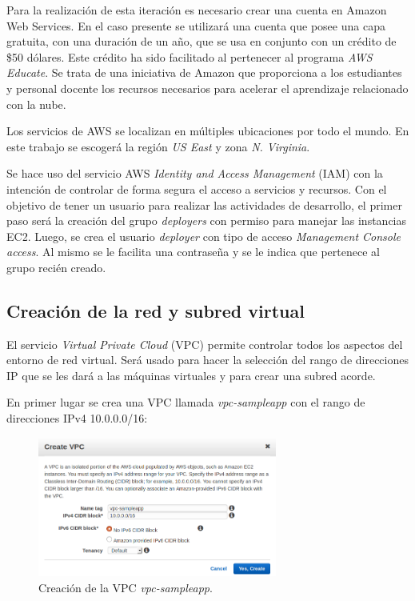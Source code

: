 Para la realización de esta iteración es necesario crear una cuenta en Amazon Web Services. En el caso presente se utilizará una cuenta que posee una capa gratuita, con una duración de un año, que se usa en conjunto con un crédito de \$50 dólares. Este crédito ha sido facilitado al pertenecer al programa \textit{AWS Educate}\cite{AWS Educate}. Se trata de una iniciativa de Amazon que proporciona a los estudiantes y personal docente los recursos necesarios para acelerar el aprendizaje relacionado con la nube.

Los servicios de AWS se localizan en múltiples ubicaciones por todo el mundo. En este trabajo se escogerá la región \textit{US East} y zona \textit{N. Virginia}.

Se hace uso del servicio AWS \textit{Identity and Access Management} (IAM) con la intención de controlar de forma segura el acceso a servicios y recursos. Con el objetivo de tener un usuario para realizar las actividades de desarrollo, el primer paso será la creación del grupo \textit{deployers} con permiso para manejar las instancias EC2. Luego, se crea el usuario \textit{deployer} con tipo de acceso \textit{Management Console access}. Al mismo se le facilita una contraseña y se le indica que pertenece al grupo recién creado.

\subsection{Creación de la red y subred virtual}

El servicio \textit{Virtual Private Cloud} (VPC) permite controlar todos los aspectos del entorno de red virtual. Será usado para hacer la selección del rango de direcciones IP que se les dará a las máquinas virtuales y para crear una subred acorde.

En primer lugar se crea una VPC llamada \textit{vpc-sampleapp} con el rango de direcciones IPv4 10.0.0.0/16:

\begin{figure}[H]
\centering
\includegraphics[width=0.7\textwidth]{images/figures/vpc-sampleapp.png}
\caption{Creación de la VPC \textit{vpc-sampleapp}.}
\end{figure}

